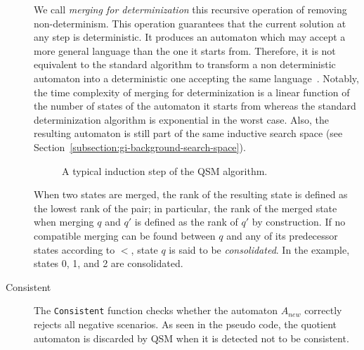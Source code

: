 \begin{description}
We call \textsl{merging for determinization} this recursive operation of removing non-determinism. This operation guarantees that the current solution at any step is deterministic. It produces an automaton which may accept a more general language than the one it starts from. Therefore, it is not equivalent to the standard algorithm to transform a non deterministic automaton into a deterministic one accepting the same language~\cite{Hopcroft:1979}. Notably, the time complexity of merging for determinization is a linear function of the number of states of the automaton it starts from whereas the standard determinization algorithm is exponential in the worst case. Also, the resulting automaton is still part of the same inductive search space (see Section~\ref{subsection:gi-background-search-space}). 

\begin{figure}
\hspace*{-1cm}
\begin{center}
\end{center}
\caption{A typical induction step of the \textsc{QSM} algorithm\label{Fig:algo:steps}.}
\end{figure}

When two states are merged, the rank of the resulting state is defined as the lowest rank of the pair; in particular, the rank of the merged state when merging $q$ and $q'$ is defined as the rank of $q'$ by construction. If no compatible merging can be found between $q$ and any of its predecessor states according to $<$, state $q$ is said to be \textsl{consolidated}. In the example, states 0, 1, and 2 are consolidated.

\item[Consistent] The \texttt{Consistent} function checks whether the automaton $A_{new}$ correctly rejects all negative scenarios. As seen in the pseudo code, the quotient automaton is discarded by \textsc{QSM} when it is detected not to be consistent.

\end{description}

